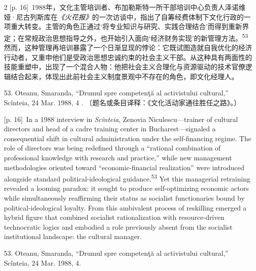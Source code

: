 \documentclass[10pt,a4paper]{article}
\begin{document}
\begin{paracol}{2}
{\scriptsize\color{gray} [p. 16]}\ 1988年，文化主管培训者、布加勒斯特一所干部培训中心负责人泽诺维娅·尼古列斯库在\textit{《火花报》}的一次访谈中，指出了自筹经费体制下文化行政的一项重大转变。主管的角色正通过‘将专业知识与研究、实践合理结合’而得到重新界定；在常规政治思想指导之外，也开始引入面向‘经济财务实现’的新管理方\mbox{法。\textsuperscript{53}}然而，这种管理再培训暴露了一个日渐显现的悖论：它既试图造就自我优化的经济行动者，又重申他们是受政治思想忠诚约束的社会主义干部。从这种具有两面性的技能重塑中，出现了一个混合人物：他把社会主义合理化与资源驱动的技术官僚逻辑结合起来，体现出此前社会主义制度景观中不存在的角色，即文化经理人。\par{\small 53. Oteanu, Smaranda, “Drumul spre competenţă al activistului cultural,” Scînteia, 24 Mar. 1988, 4 . 〔题名或条目译释：《文化活动家通往胜任之路》。〕\par}
\switchcolumn
{\scriptsize\color{gray} [p. 16]}\ In a 1988 interview in \textit{Scînteia}, Zenovia Niculescu—trainer of cultural directors and head of a cadre training center in Bucharest—signaled a consequential shift in cultural administration under the self-financing regime. The role of directors was being redefined through a “rational combination of professional knowledge with research and practice,” while new management methodologies oriented toward “economic-financial realization” were introduced alongside standard political-ideological guidance.\nobreak\textsuperscript{53} Yet this managerial retraining revealed a looming paradox: it sought to produce self-optimizing economic actors while simultaneously reaffirming their status as socialist functionaries bound by political-ideological loyalty. From this ambivalent process of reskilling emerged a hybrid figure that combined socialist rationalization with resource-driven technocratic logics and embodied a role previously absent from the socialist institutional landscape: the cultural manager.\par{\small 53. Oteanu, Smaranda, “Drumul spre competenţă al activistului cultural,” Scînteia, 24 Mar. 1988, 4.\par}
\switchcolumn*

\end{paracol}
\end{document}
